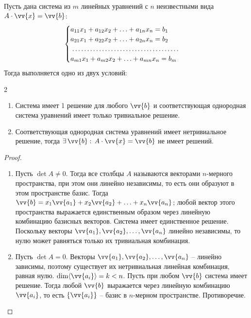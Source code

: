 \documentclass[12pt]{article}
\begin{document}
\begin{theorem}
    Пусть дана система из $m$ линейных уравнений с $n$ неизвестными вида $A\cdot \vv{x}=\vv{b}$:
    $$\begin{cases}
        a_{11}x_1 + a_{12}x_2 + \ldots + a_{1n}x_n = b_1\\
        a_{21}x_1 + a_{22}x_2 + \ldots + a_{2n}x_n = b_2\\
        \makebox[57mm]{\dotfill}\\
        a_{m1}x_1 + a_{m2}x_2 + \ldots + a_{mn}x_n = b_m
    \end{cases}$$
    Тогда выполняется одно из двух условий:
    \begin{center}
        \begin{multicols}{2}
            \begin{enumerate}
                \item Система имеет 1 решение для любого $\vv{b}$ и соответствующая однородная система уравнений имеет только тривиальное решение.
                \item Соответствующая однородная система уравнений имеет нетривиальное решение, тогда $\exists\,\vv{b}:\,A\cdot\vv{x}=\vv{b}$ не имеет решений.
            \end{enumerate}
        \end{multicols}
    \end{center}
\end{theorem}
\begin{proof}
    \hfill
    \begin{enumerate}
        \item Пусть $\det A\neq0$. Тогда все столбцы $A$ называются векторами $n$-мерного пространства, при этом они линейно независимы, то есть они образуют в этом пространстве базис. Тогда $\vv{b}=x_1\vv{a_1}+x_2\vv{a_2}+\ldots+x_n\vv{a_n}$; любой вектор этого пространства выражается единственным образом через линейную комбинацию базисных векторов. Система имеет единственное решение. Поскольку векторы $\vv{a_1},\vv{a_2},\ldots,\vv{a_n}$ линейно независимы, то нулю может равняться только их тривиальная комбинация.
        \item Пусть $\det A=0$. Векторы $\vv{a_1},\vv{a_2},\ldots,\vv{a_n}$ – линейно зависимы, поэтому существует их нетривиальная линейная комбинация, равная нулю. $\dim \langle \vv{a_i} \rangle=k<n$. Пусть при любом $\vv{b}$ система имеет решение. Тогда любой $\vv{b}$ выражается через линейную комбинацию $\vv{a_i}$, то есть $\{\vv{a_i}\}$ – базис в $n$-мерном пространстве. Противоречие.
    \end{enumerate}
\end{proof}
\end{document}
